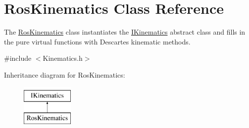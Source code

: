 \hypertarget{classRosKinematics}{\section{Ros\-Kinematics Class Reference}
\label{classRosKinematics}
}


The \hyperlink{classRosKinematics}{Ros\-Kinematics} class instantiates the \hyperlink{classIKinematics}{I\-Kinematics} abstract class and fills in the pure virtual functions with Descartes kinematic methods.  




{\ttfamily \#include $<$Kinematics.\-h$>$}

Inheritance diagram for Ros\-Kinematics\-:\begin{figure}[H]
\begin{center}
\leavevmode
\includegraphics[height=2.000000cm]{classRosKinematics}
\end{center}
\end{figure}
